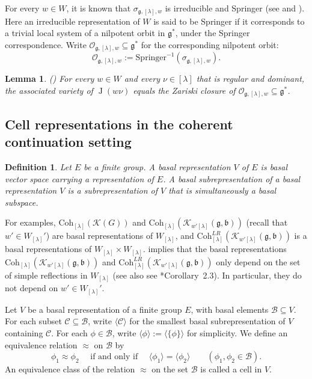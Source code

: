 \documentclass[12pt,a4paper]{amsart}
\def\subset{\subseteq}
\newcommand{\CB}{{\mathcal {B}}}
\newcommand{\CC}{{\mathcal {C}}}
\newcommand{\CK}{{\mathcal {K}}}
\newcommand{\CO}{{\mathcal {O}}}
\newcommand{\oJ}{\operatorname{J}}
\newcommand{\g}{\mathfrak g}
\renewcommand{\b}{\mathfrak b}
\newcommand{\la}{\langle}
\newcommand{\ra}{\rangle}
\numberwithin{equation}{section}
\newtheorem{lem}[thm]{Lemma}
\newtheorem{defn}[thm]{Definition}
\theoremstyle{remark}
\def\Coh{\mathrm{Coh}}
\newcommand{\Lam}{{[\lambda]}}
\begin{document}
For every $w\in W$, it is known that $\sigma_{\g,\Lam,w}$ is irreducible and Springer (see \cite{Ho} and \cite[Section 2.10]{J.av}).  Here an irreducible representation of $W$ is said to be Springer if it corresponds to a trivial local system of a nilpotent orbit in $\g^*$, under the Springer correspondence. Write $\CO_{\g, \Lam,w}\subset \g^*$ for the corresponding nilpotent orbit:
\begin{equation*} %
\CO_{\g, \Lam,w} :=\mathrm{Springer}^{-1}(\sigma_{\g,\Lam,w}).
\end{equation*}

\begin{lem}\label{associatedv} (\cite[Theorem 3.9]{J.av})
For every $w\in W$ and every $\nu \in \Lam$ that is regular and dominant, the associated variety of $\oJ(w\nu)$ equals the Zariski closure of $\CO_{\g, \Lam,w}\subset \g^*$.
\end{lem}



\subsection{Cell representations in the coherent continuation setting}\label{seccell}

\begin{defn}
Let $E$ be a  finite group. A basal representation $V$ of $E$ is basal vector space carrying a representation of $E$. A basal subrepresentation of a basal representation $V$ is a subrepresentation of $V$ that is simultaneously a basal subspace.
\end{defn}

For examples, $ \Coh_{\Lam}( \CK(G))$ and $ \Coh_{\Lam}( \CK_{w'\Lam}(\g,\b))$
(recall that $w'\in W_\Lam'$) are basal representations of $W_\Lam$, and
$ \Coh^{LR}_{\Lam}( \CK_{w'\Lam}(\g,\b))$ is a basal representations of
$W_\Lam\times W_\Lam$.  implies that the basal representations
$ \Coh_{\Lam}( \CK_{w'\Lam}(\g,\b))$ and
$\Coh^{LR}_{\Lam}( \CK_{w'\Lam}(\g,\b))$ only depend on the set of simple
reflections in $W_\Lam$ (see also see \cite{BV2}*{Corollary~2.3}). In
particular, they do not depend on $w'\in W_\Lam'$.



Let $V$ be a basal representation of a finite group $E$, with basal elements
$\CB\subset V$. For each subset $\mathcal C\subset \CB$, write $\la \CC\ra$ for
the smallest basal subrepresentation of $V$ containing $\CC$. For each
$\phi\in \CB$, write $\la \phi\ra:=\la \{\phi\}\ra$ for simplicity. We define an equivalence relation $\approx$ on $\CB$  by
\[
  \phi_1 \approx \phi_2 \quad \textrm{ if and only if
  } \quad \la \phi_1 \ra =\la \phi_2 \ra \qquad (\phi_1, \phi_2\in \CB).
\]
An equivalence class of the relation $\approx$ on the set $\CB$ is called a cell in $V$.
\end{document}
